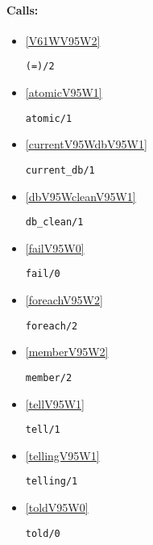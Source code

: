 \paragraph{Calls:} 
\begin{itemize}
\item \ref{V61WV95W2} 
\begin{verbatim}
(=)/2
\end{verbatim}

\item \ref{atomicV95W1} 
\begin{verbatim}
atomic/1
\end{verbatim}

\item \ref{currentV95WdbV95W1} 
\begin{verbatim}
current_db/1
\end{verbatim}

\item \ref{dbV95WcleanV95W1} 
\begin{verbatim}
db_clean/1
\end{verbatim}

\item \ref{failV95W0} 
\begin{verbatim}
fail/0
\end{verbatim}

\item \ref{foreachV95W2} 
\begin{verbatim}
foreach/2
\end{verbatim}

\item \ref{memberV95W2} 
\begin{verbatim}
member/2
\end{verbatim}

\item \ref{tellV95W1} 
\begin{verbatim}
tell/1
\end{verbatim}

\item \ref{tellingV95W1} 
\begin{verbatim}
telling/1
\end{verbatim}

\item \ref{toldV95W0} 
\begin{verbatim}
told/0
\end{verbatim}

\end{itemize}

